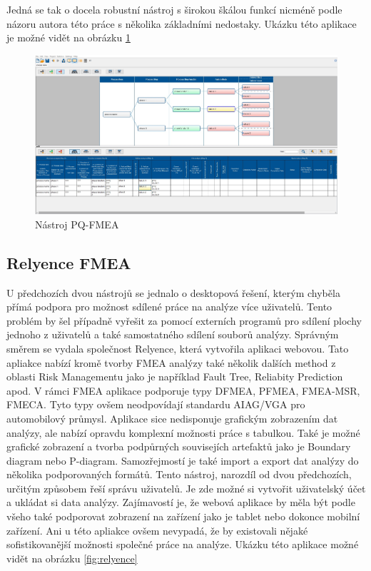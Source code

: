 Jedná se tak o docela robustní nástroj s širokou škálou funkcí nicméně podle názoru autora této práce s několika základními nedostaky. Ukázku této aplikace je možné vidět na obrázku \ref{fig:pq}

\begin{figure}[h]
\centering
	\includegraphics[width=1.0\textwidth]{Figures/pq.jpg}
	\caption{Nástroj PQ-FMEA }
	\label{fig:pq}
\end{figure}

\subsection{Relyence FMEA}
U předchozích dvou nástrojů se jednalo o desktopová řešení, kterým chyběla přímá podpora pro možnost sdílené práce na analýze více uživatelů. Tento problém by šel případně vyřešit za pomocí externích programů pro sdílení plochy jednoho z uživatelů a také samostatného sdílení souborů analýzy. Správným směrem se vydala společnost Relyence, která vytvořila aplikaci webovou. Tato apliakce nabízí kromě tvorby FMEA analýzy také několik dalších method z oblasti Risk Managementu jako je například Fault Tree, Reliabity Prediction apod. V rámci FMEA aplikace podporuje typy DFMEA, PFMEA, FMEA-MSR, FMECA. Tyto typy ovšem neodpovídají standardu AIAG/VGA pro automobilový průmysl. Aplikace sice nedisponuje grafickým zobrazením dat analýzy, ale nabízí opravdu komplexní možnosti práce s tabulkou. Také je možné grafické zobrazení a tvorba podpůrných souvisejích artefaktů jako je Boundary diagram nebo P-diagram. Samozřejmostí je také import a export dat analýzy do několika podporovaných formátů. Tento nástroj, narozdíl od dvou předchozích, určitým způsobem řeší správu uživatelů. Je zde možné si vytvořit uživatelský účet a ukládat si data analýzy. Zajímavostí je, že webová aplikace by měla být podle všeho také podporovat zobrazení na zařízení jako je tablet nebo dokonce mobilní zařízení. Ani u této apliakce ovšem nevypadá, že by existovali nějaké sofistikovanější možnosti společné práce na analýze. Ukázku této aplikace možné vidět na obrázku  \ref{fig:relyence}

